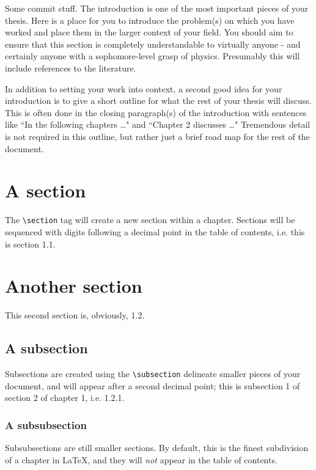 
Some commit stuff.
The introduction is one of the most important pieces of your thesis.  Here is a place for you to introduce the problem(s) on which you have worked and place them in the larger context of your field.  You should aim to ensure that this section is completely understandable to virtually anyone - and certainly anyone with a sophomore-level grasp of physics.  Presumably this will include references to the literature.

In addition to setting your work into context, a second good idea for your introduction is to give a short outline for what the rest of your thesis will discuss.  This is often done in the closing paragraph(s) of the introduction with sentences like ``In the following chapters \ldots " and ``Chapter 2 discusses \ldots"  Tremendous detail is not required in this outline, but rather just a brief road map for the rest of the document.

\section{A section}

The \texttt{\textbackslash section} tag will create a new section within a chapter.  Sections will be sequenced with digits following a decimal point in the table of contents, i.e. this is section 1.1.

\section{Another section}

This second section is, obviously, 1.2.

\subsection{A subsection}

Subsections are created using the \texttt{\textbackslash subsection} delineate smaller pieces of your document, and will appear after a second decimal point; this is subsection 1 of section 2 of chapter 1, i.e. 1.2.1.

\subsubsection{A subsubsection}

Subsubsections are still smaller sections.  By default, this is the finest subdivision of a chapter in \LaTeX, and they will \emph{not} appear in the table of contents.  


